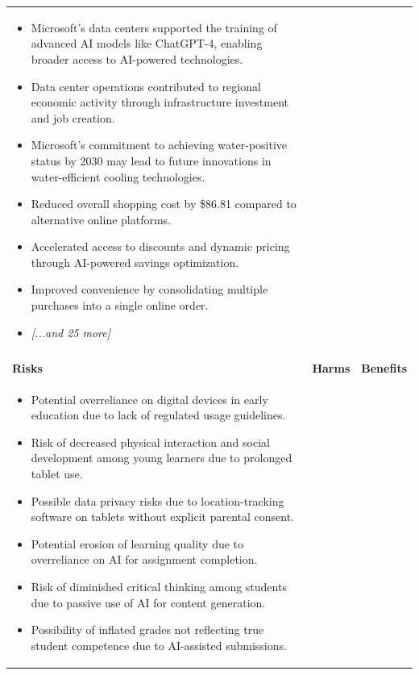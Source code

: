 \begin{longtable}{p{5.2cm}|p{5.2cm}|p{5.2cm}}
\begin{itemize}[leftmargin=*, nosep, before=\vspace{-0.5\baselineskip}, after=\vspace{-0.5\baselineskip}]
\footnotesize
\item Microsoft's data centers supported the training of advanced AI models like ChatGPT-4, enabling broader access to AI-powered technologies.
\item Data center operations contributed to regional economic activity through infrastructure investment and job creation.
\item Microsoft's commitment to achieving water-positive status by 2030 may lead to future innovations in water-efficient cooling technologies.
\item Reduced overall shopping cost by \$86.81 compared to alternative online platforms.
\item Accelerated access to discounts and dynamic pricing through AI-powered savings optimization.
\item Improved convenience by consolidating multiple purchases into a single online order.
\item \textit{[...and 25 more]}
\end{itemize} \\
\pagebreak
\multicolumn{3}{l}{\textbf{\large Education and vocational training} \textit{(N=30 articles)}} \\
\midrule
\textbf{Risks} & \textbf{Harms} & \textbf{Benefits} \\
\midrule
\begin{itemize}[leftmargin=*, nosep, before=\vspace{-0.5\baselineskip}, after=\vspace{-0.5\baselineskip}] 
\footnotesize
\item Potential overreliance on digital devices in early education due to lack of regulated usage guidelines.
\item Risk of decreased physical interaction and social development among young learners due to prolonged tablet use.
\item Possible data privacy risks due to location-tracking software on tablets without explicit parental consent.
\item Potential erosion of learning quality due to overreliance on AI for assignment completion.
\item Risk of diminished critical thinking among students due to passive use of AI for content generation.
\item Possibility of inflated grades not reflecting true student competence due to AI-assisted submissions.
\end{itemize} & \begin{itemize}[leftmargin=*, nosep, before=\vspace{-0.5\baselineskip}, after=\vspace{-0.5\baselineskip}] 

\end{itemize}
\end{longtable}
